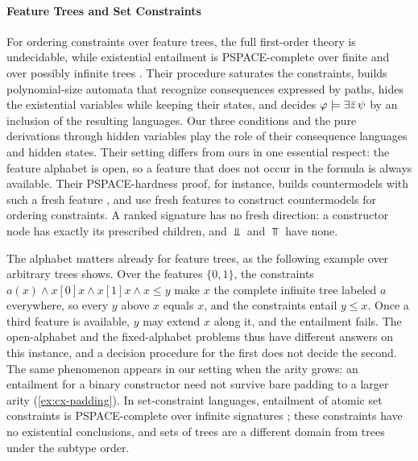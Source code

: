 \paragraph{Feature Trees and Set Constraints}
For ordering constraints over feature trees, the full first-order theory is
undecidable, while existential entailment is PSPACE-complete over finite and
over possibly infinite trees \citep{MullerNiehrenTreinen98,MullerNiehrenTreinen01}.
Their procedure saturates the constraints, builds polynomial-size automata that
recognize consequences expressed by paths, hides the existential variables
while keeping their states, and decides $\varphi\models\exists\bar z\,\psi$ by an
inclusion of the resulting languages. Our three conditions and the pure
derivations through hidden variables play the role of their consequence
languages and hidden states. Their setting differs from ours in one essential
respect: the feature alphabet is open, so a feature that does not occur in the
formula is always available. Their PSPACE-hardness proof, for instance, builds
countermodels with such a fresh feature
\citep[Lemma~5.5]{MullerNiehrenTreinen01}, and \citet{MullerNiehrenPodelski00}
use fresh features to construct countermodels for ordering constraints. A
ranked signature has no fresh direction: a constructor node has exactly its
prescribed children, and $\Bot$ and $\Top$ have none.

The alphabet matters already for feature trees, as the following example over
arbitrary trees shows. Over the features $\{0,1\}$, the constraints
$a(x)\wedge x[0]x\wedge x[1]x\wedge x\le y$ make $x$ the complete infinite tree
labeled $a$ everywhere, so every $y$ above $x$ equals $x$, and the constraints
entail $y\le x$. Once a third feature is available, $y$ may extend $x$ along
it, and the entailment fails. The open-alphabet and the fixed-alphabet
problems thus have different answers on this instance, and a decision
procedure for the first does not decide the second. The same phenomenon
appears in our setting when the arity grows: an entailment for a binary
constructor need not survive bare padding to a larger arity
(\cref{ex:cx-padding}). In set-constraint languages, entailment of atomic set
constraints is PSPACE-complete over infinite signatures
\citep{NiehrenMullerTalbot99}; these constraints have no existential
conclusions, and sets of trees are a different domain from trees under the
subtype order.

